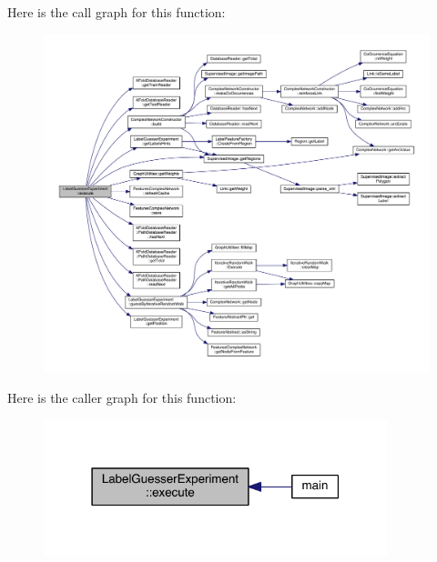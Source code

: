 Here is the call graph for this function\+:
\nopagebreak
\begin{figure}[H]
\begin{center}
\leavevmode
\includegraphics[width=350pt]{class_label_guesser_experiment_ac59f249adb0e74044f30f2847006743f_cgraph}
\end{center}
\end{figure}




Here is the caller graph for this function\+:\nopagebreak
\begin{figure}[H]
\begin{center}
\leavevmode
\includegraphics[width=283pt]{class_label_guesser_experiment_ac59f249adb0e74044f30f2847006743f_icgraph}
\end{center}
\end{figure}


